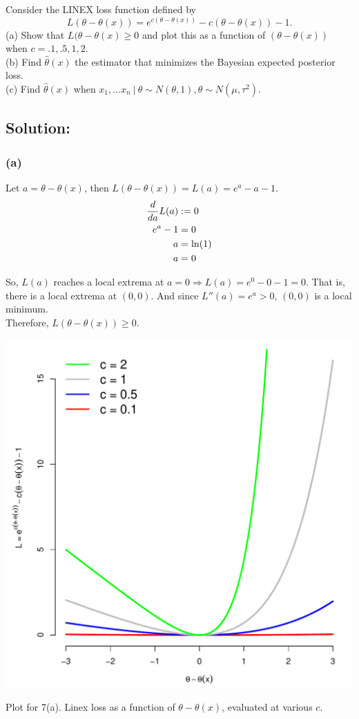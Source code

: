 \def\mya{\theta-\theta(x)}
\def\linex{e^{c(\mya)} - c(\mya) -1}

Consider the LINEX loss function defined by 
\[
  L(\mya) = \linex.
\]
(a) Show that $L(\mya \ge 0 $ and plot this as a function of $(\mya)$ when $c= .1, .5, 1, 2$.\\
(b) Find $\hat\theta(x)$ the estimator that minimizes the Bayesian expected posterior loss.\\
(c) Find $\hat\theta(x)$ when $x_1,...x_n~|~\theta \sim N(\theta,1), \theta \sim N(\mu,\tau^2)$.

\subsection*{Solution:}
\subsubsection*{(a)}
Let $a = \mya$, then $L(\mya) = L(a) = e^a - a - 1$. 
\begin{align*}
  \displaystyle{{d}\over{d a}} L(a) &:= 0 \\
  e^a - 1 &= 0 \\
  a &= \ln(1) \\
  a &= 0 \\
\end{align*}

\noindent
So, $L(a)$ reaches a local extrema at $a=0 \Rightarrow L(a) = e^0 - 0 - 1 = 0$. 
That is, there is a local extrema at $(0,0)$.
And since $L''(a) = e^a > 0$, $(0,0)$ is a local minimum.\\

\noindent
Therefore, $L(\mya) \geq 0$.

\beginmyfig
\includegraphics[scale=.7]{../img/fig1.pdf}
\caption{Plot for 7(a). Linex loss as a function of $\theta - \theta(x)$, evaluated at various $c$.}
\endmyfig

